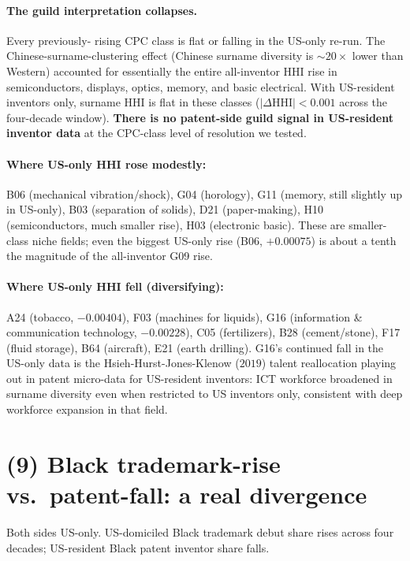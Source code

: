 \documentclass[11pt]{article}
\begin{document}
\paragraph{The guild interpretation collapses.} Every previously-
rising CPC class is flat or falling in the US-only re-run. The
Chinese-surname-clustering effect (Chinese surname diversity is
$\sim 20\times$ lower than Western) accounted for essentially the
entire all-inventor HHI rise in semiconductors, displays, optics,
memory, and basic electrical. With US-resident inventors only,
surname HHI is flat in these classes ($|{\Delta\text{HHI}}| < 0.001$
across the four-decade window). \textbf{There is no patent-side
guild signal in US-resident inventor data} at the CPC-class level
of resolution we tested.

\paragraph{Where US-only HHI rose modestly:} B06 (mechanical
vibration/shock), G04 (horology), G11 (memory, still slightly up
in US-only), B03 (separation of solids), D21 (paper-making), H10
(semiconductors, much smaller rise), H03 (electronic basic). These
are smaller-class niche fields; even the biggest US-only rise
(B06, $+0.00075$) is about a tenth the magnitude of the all-inventor
G09 rise.

\paragraph{Where US-only HHI fell (diversifying):} A24 (tobacco,
$-0.00404$), F03 (machines for liquids), G16 (information \&
communication technology, $-0.00228$), C05 (fertilizers), B28
(cement/stone), F17 (fluid storage), B64 (aircraft), E21 (earth
drilling). G16's continued fall in the US-only data is the
Hsieh-Hurst-Jones-Klenow ($2019$) talent reallocation playing out
in patent micro-data for US-resident inventors: ICT workforce
broadened in surname diversity even when restricted to US
inventors only, consistent with deep workforce expansion in that
field.

\section*{(9) Black trademark-rise vs.\ patent-fall: a real divergence}

Both sides US-only. US-domiciled Black trademark debut share rises
across four decades; US-resident Black patent inventor share falls.
\end{document}
